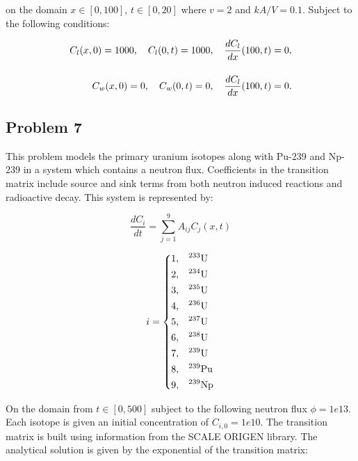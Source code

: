 \noindent on the domain $x \in [0,100]$, $t \in [0, 20]$ where $v = 2$ and $kA/V = 0.1$. Subject to the following conditions:

\begin{equation}
\setlength{\jot}{15pt}
\begin{split}
    C_{l}(x, 0) = 1000, \quad C_{l}(0,t) = 1000, \quad \frac{dC_{l}}{dx}(100, t) = 0, \\
    C_{w}(x, 0) = 0, \quad C_{w}(0,t) = 0, \quad \frac{dC_{l}}{dx}(100, t) = 0. \\
\end{split}
\end{equation}

\subsection{Problem 7}
This problem models the primary uranium isotopes along with Pu-239 and Np-239 in a system which contains a neutron flux. Coefficients in the transition matrix include source and sink terms from both neutron induced reactions and radioactive decay. This system is represented by:


\begin{equation}
\frac{d C_i}{dt} = \sum^9_{j = 1} A_{ij} C_j (x, t)
\end{equation}

\begin{equation}
i = \begin{dcases}
  1 , & \text{$^{233}$U}  \\
  2 , & \text{$^{234}$U}  \\
  3 , & \text{$^{235}$U}  \\
  4 , & \text{$^{236}$U}  \\
  5 , & \text{$^{237}$U}  \\
  6 , & \text{$^{238}$U}  \\
  7 , & \text{$^{239}$U}  \\
  8 , & \text{$^{239}$Pu} \\
  9 , & \text{$^{239}$Np} \\
\end{dcases}
\end{equation}

\noindent On the domain from $t \in [0, 500]$ subject to the following neutron flux $\phi = 1e13$. Each isotope is given an initial concentration of $C_{i, 0} = 1e10$. The transition matrix is built using information from the SCALE ORIGEN library. The analytical solution is given by the exponential of the transition matrix:

